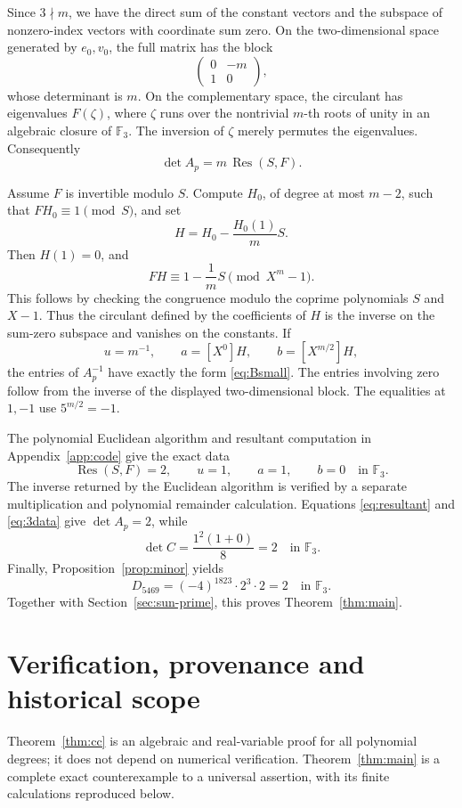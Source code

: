 \documentclass[11pt,a4paper]{article}
\theoremstyle{remark}
\newcommand{\F}{\mathbb F}
\DeclareMathOperator{\Res}{Res}
\begin{document}
Since \(3\nmid m\), we have the direct sum of the constant vectors
and the subspace of nonzero-index vectors with coordinate sum zero.
On the two-dimensional space generated by \(e_0,v_0\), the full
matrix has the block
\[
\begin{pmatrix}0&-m\\1&0\end{pmatrix},
\]
whose determinant is \(m\).
On the complementary space, the circulant has eigenvalues
\(F(\zeta)\), where \(\zeta\) runs over the nontrivial \(m\)-th
roots of unity in an algebraic closure of \(\F_3\).
The inversion of \(\zeta\) merely permutes the eigenvalues.
Consequently
\begin{equation}\label{eq:resultant}
\det A_p=m\,\Res(S,F).
\end{equation}

Assume \(F\) is invertible modulo \(S\).
Compute \(H_0\), of degree at most \(m-2\), such that
\(FH_0\equiv1\pmod S\), and set
\begin{equation}\label{eq:H}
H=H_0-\frac{H_0(1)}mS.
\end{equation}
Then \(H(1)=0\), and
\[
FH\equiv1-\frac1mS\pmod{X^m-1}.
\]
This follows by checking the congruence modulo the coprime
polynomials \(S\) and \(X-1\).
Thus the circulant defined by the coefficients of \(H\) is the
inverse on the sum-zero subspace and vanishes on the constants.
If
\[
u=m^{-1},\qquad a=[X^0]H,\qquad b=[X^{m/2}]H,
\]
the entries of \(A_p^{-1}\) have exactly the form
\eqref{eq:Bsmall}. The entries involving zero follow from the
inverse of the displayed two-dimensional block. The equalities
at \(1,-1\) use \(5^{m/2}=-1\).

The polynomial Euclidean algorithm and resultant computation in
Appendix~\ref{app:code} give the exact data
\begin{equation}\label{eq:3data}
\Res(S,F)=2,\qquad u=1,\qquad a=1,\qquad b=0
\quad\text{in }\F_3.
\end{equation}
The inverse returned by the Euclidean algorithm is verified by a
separate multiplication and polynomial remainder calculation.
Equations \eqref{eq:resultant} and \eqref{eq:3data} give
\(\det A_p=2\), while
\[
\det C=\frac{1^2(1+0)}8=2\quad\text{in }\F_3.
\]
Finally, Proposition~\ref{prop:minor} yields
\[
D_{5469}=(-4)^{1823}\cdot2^3\cdot2=2
\quad\text{in }\F_3.
\]
Together with Section~\ref{sec:sun-prime}, this proves Theorem~\ref{thm:main}.


\section{Verification, provenance and historical scope}
\label{sec:scope}
Theorem~\ref{thm:cc} is an algebraic and real-variable proof for all
polynomial degrees; it does not depend on numerical verification.
Theorem~\ref{thm:main} is a complete exact counterexample to a universal
assertion, with its finite calculations reproduced below.
\end{document}
